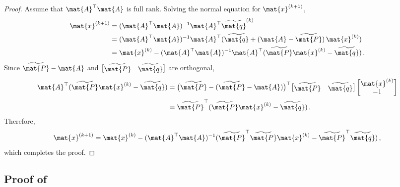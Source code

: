 \begin{proof}
Assume that $\mat{A}^\top \mat{A}$ is full rank.
Solving the normal equation for $\mat{x}^{(k+1)}$,
\begin{align*}
\mat{x}^{(k+1)}
&= (\mat{A}^\top \mat{A})^{-1} \mat{A}^\top \widetilde{\mat{q}}^{(k)}\\
&= (\mat{A}^\top \mat{A})^{-1} \mat{A}^\top (\widetilde{\mat{q}} + (\mat{A} - \widetilde{\mat{P}})\, \mat{x}^{(k)})
\\ & =
\mat{x}^{(k)} - (\mat{A}^\top \mat{A})^{-1} \mat{A}^\top (\widetilde{\mat{P}} \mat{x}^{(k)} - \widetilde{\mat{q}})\,.
\end{align*}
Since $\widetilde{\mat{P}}-\mat{A}$ and $\bigl[\begin{matrix}
\widetilde{\mat{P}} & \widetilde{\mat{q}}
\end{matrix}\bigr]$ are orthogonal, 
\begin{align*}
    \mat{A}^\top (\widetilde{\mat{P}} \mat{x}^{(k)} - \widetilde{\mat{q}})
    &=
    \bigl(\widetilde{\mat{P}} - (\widetilde{\mat{P}} - \mat{A})\bigr)^\top \bigl[\begin{matrix}
        \widetilde{\mat{P}} & \widetilde{\mat{q}}
    \end{matrix}\bigr] \begin{bmatrix}
    \mat{x}^{(k)} \\ -1
    \end{bmatrix} \\
    &= 
    \widetilde{\mat{P}}^\top (\widetilde{\mat{P}} \mat{x}^{(k)} - \widetilde{\mat{q}})\,.
\end{align*}
Therefore,
\[
    \mat{x}^{(k+1)}
    =
    \mat{x}^{(k)} - (\mat{A}^\top \mat{A})^{-1} (\widetilde{\mat{P}}^\top \widetilde{\mat{P}} \mat{x}^{(k)} - \widetilde{\mat{P}}^\top \widetilde{\mat{q}})\,,
\]
which completes the proof.
\end{proof}

\subsection{Proof of }

